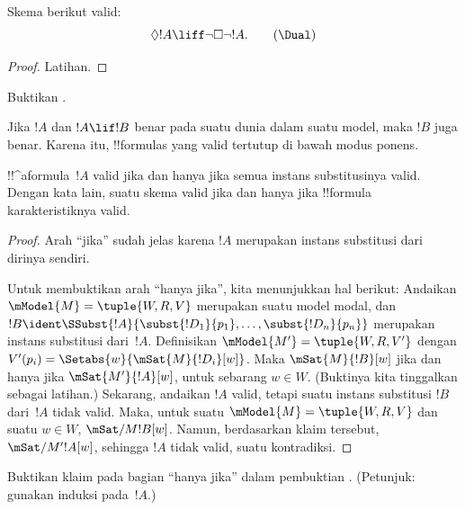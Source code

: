 \documentclass[../../../include/open-logic-section]{subfiles}
\begin{document}
\begin{prop}
  Skema \Dual{} berikut valid:
  \begin{equation*}
  \Diamond !A \liff \lnot\Box\lnot !A. \tag{\Dual}
  \end{equation*}
\end{prop}

\begin{proof}
  Latihan.
\end{proof}

\begin{prob}
  Buktikan .
\end{prob}

\begin{prop}
  Jika $!A$ dan $!A \lif !B$ benar pada suatu dunia dalam suatu model,
  maka $!B$ juga benar. Karena itu, !!{formula}s yang valid tertutup di bawah
  modus ponens.
\end{prop}

\begin{prop}
  !!^a{formula}~$!A$ valid jika dan hanya jika semua instans substitusinya
  valid. Dengan kata lain, suatu skema valid jika dan hanya jika
  !!{formula} karakteristiknya valid.
\end{prop}

\begin{proof}
  Arah ``jika'' sudah jelas karena $!A$ merupakan instans substitusi dari
  dirinya sendiri.

  Untuk membuktikan arah ``hanya jika'', kita menunjukkan hal berikut:
  Andaikan $\mModel{M} = \tuple{W, R, V}$ merupakan suatu model modal, dan
  $!B \ident \SSubst{!A}{\subst{!D_1}{p_1},\dots,\subst{!D_n}{p_n}}$
  merupakan instans substitusi dari~$!A$. Definisikan
  $\mModel{M'} = \tuple{W, R, V'}$ dengan
  $V'(p_i) = \Setabs{w}{\mSat{M}{!D_i}[w]}$. Maka
  $\mSat{M}{!B}[w]$ jika dan hanya jika $\mSat{M'}{!A}[w]$, untuk sebarang
  $w \in W$. (Buktinya kita tinggalkan sebagai latihan.) Sekarang, andaikan
  $!A$ valid, tetapi suatu instans substitusi $!B$ dari~$!A$ tidak valid.
  Maka, untuk suatu $\mModel{M} = \tuple{W, R, V}$ dan suatu $w \in W$,
  $\mSat/{M}{!B}[w]$. Namun, berdasarkan klaim tersebut,
  $\mSat/{M'}{!A}[w]$, sehingga $!A$ tidak valid, suatu kontradiksi.
\end{proof}

\begin{prob}
  Buktikan klaim pada bagian ``hanya jika'' dalam pembuktian
  . (Petunjuk: gunakan induksi
  pada~$!A$.)
\end{prob}
\end{document}
